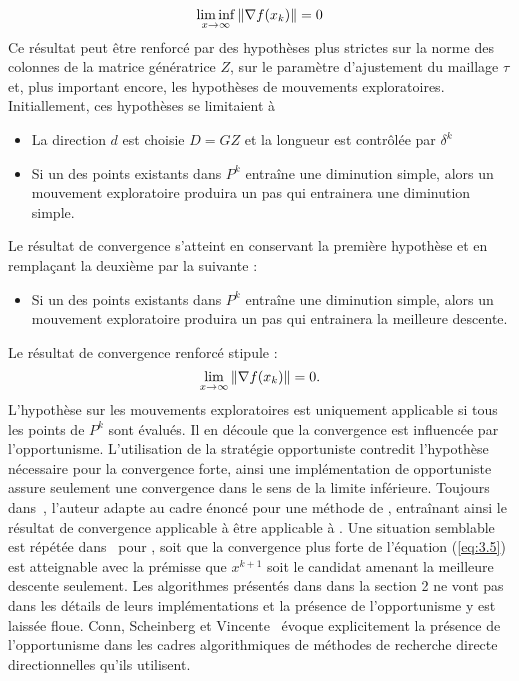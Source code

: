 \begin{equation}
	\label{eq:3.4}\liminf\limits_{x\rightarrow \infty}\left\lVert\nabla f(x_k)\right\rVert = 0
\end{equation}
Ce résultat peut être renforcé par des hypothèses plus strictes sur la norme des colonnes de la matrice génératrice $Z$, sur le paramètre d'ajustement du maillage $\tau$ et, plus important encore, les hypothèses de mouvements exploratoires. Initiallement, ces hypothèses se limitaient à 
\begin{itemize}
	\item La direction $d$ est choisie $D=GZ$ et la longueur est contrôlée par $\delta^k$ 
	\item Si un des points existants dans $P^k$ entraîne une diminution simple, alors un mouvement exploratoire produira un pas qui entrainera une diminution simple.
\end{itemize}
Le résultat de convergence s'atteint en conservant la première hypothèse et en remplaçant la deuxième par la suivante : 
\begin{itemize}
	\item Si un des points existants dans $P^k$ entraîne une diminution simple, alors un mouvement exploratoire produira un pas qui entrainera la meilleure descente. 
\end{itemize}
Le résultat de convergence renforcé stipule :
\begin{equation}
	\label{eq:3.5}\lim\limits_{x\rightarrow \infty}\left\lVert\nabla f(x_k)\right\rVert = 0.
\end{equation}
L'hypothèse sur les mouvements exploratoires est uniquement applicable si tous les points de $P^k$ sont évalués. Il en découle que la convergence est influencée par l'opportunisme. L'utilisation de la stratégie opportuniste contredit l'hypothèse nécessaire pour la convergence forte, ainsi une implémentation de \GPS opportuniste assure seulement une convergence dans le sens de la limite inférieure. Toujours dans~\cite{Torc97a}, l'auteur adapte \CS au cadre énoncé pour une méthode de \GPS, entraînant ainsi le résultat de convergence applicable à être applicable à \CS. Une situation semblable est répétée dans~\cite{KoLeTo03a} pour \GSS, soit que la convergence plus forte de l'équation (\ref{eq:3.5}) est atteignable avec la prémisse que $x^{k+1}$ soit le candidat amenant la meilleure descente seulement. 
Les algorithmes présentés dans dans la section 2 ne vont pas dans les détails de leurs implémentations et la présence de l'opportunisme y est laissée floue. Conn, Scheinberg et Vincente~\cite{CoScVibook} évoque explicitement la présence de l'opportunisme dans les cadres algorithmiques de méthodes de recherche directe directionnelles qu'ils utilisent.
